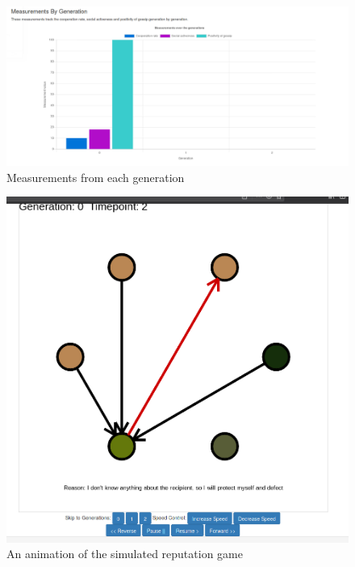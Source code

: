 \documentclass[]{final_report}
\begin{document}
\begin{figure}
	\includegraphics[width=\textwidth]{RepGenCoop.png}
	\caption{Measurements from each generation}
	\label{fig:rep_gen_analysis}
\end{figure}
\begin{figure}
	\includegraphics[width=\textwidth]{RepAnim.png}
	\caption{An animation of the simulated reputation game}
	\label{fig:rep_anim}
\end{figure}
\end{document}
